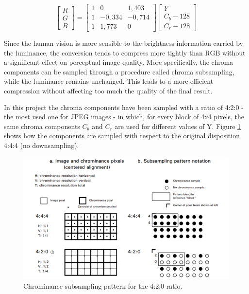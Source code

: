 \documentclass[14pt,a4paper]{extarticle}
\begin{document}
\begin{equation}
\begin{bmatrix}
R\\ 
G\\ 
B
\end{bmatrix}
= 
\begin{bmatrix}
1 & 0 & 1,403\\
1 & -0,334 & -0,714\\
1 & 1,773 & 0
\end{bmatrix}
\begin{bmatrix}
Y\\ 
C_b - 128\\ 
C_r - 128
\end{bmatrix}
\end{equation}

Since the human vision is more sensible to the brightness information carried by the luminance, the conversion tends to compress more tightly than RGB  without a significant effect on perceptual image quality. More specifically, the chroma components can be sampled through a procedure called chroma subsampling, while the luminance remains unchanged. This leads to a more efficient compression without affecting too much the quality of the final result. 

In this project the chroma components have been sampled with a ratio of 4:2:0 - the most used one for JPEG images - in which, for every block of 4x4 pixels, the same chroma components $C_b$ and $C_r$ are used for different values of Y. Figure \ref{fig:chroma} shows how the components are sampled with respect to the original disposition 4:4:4 (no downsampling).

\begin{figure}[h]
\includegraphics[width=\linewidth, center]{pics/chroma.png} 
\caption{Chrominance subsampling pattern for the 4:2:0 ratio.}
\label{fig:chroma}
\end{figure}
\end{document}
